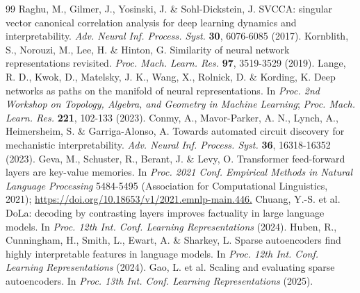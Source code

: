 \documentclass[11pt]{article}
\begin{document}
\begin{thebibliography}{99}
 Raghu, M., Gilmer, J., Yosinski, J. \& Sohl-Dickstein, J. SVCCA: singular vector canonical correlation analysis for deep learning dynamics and interpretability. \emph{Adv. Neural Inf. Process. Syst.} \textbf{30}, 6076-6085 (2017).
 Kornblith, S., Norouzi, M., Lee, H. \& Hinton, G. Similarity of neural network representations revisited. \emph{Proc. Mach. Learn. Res.} \textbf{97}, 3519-3529 (2019).
 Lange, R. D., Kwok, D., Matelsky, J. K., Wang, X., Rolnick, D. \& Kording, K. Deep networks as paths on the manifold of neural representations. In \emph{Proc. 2nd Workshop on Topology, Algebra, and Geometry in Machine Learning}; \emph{Proc. Mach. Learn. Res.} \textbf{221}, 102-133 (2023).
 Conmy, A., Mavor-Parker, A. N., Lynch, A., Heimersheim, S. \& Garriga-Alonso, A. Towards automated circuit discovery for mechanistic interpretability. \emph{Adv. Neural Inf. Process. Syst.} \textbf{36}, 16318-16352 (2023).
 Geva, M., Schuster, R., Berant, J. \& Levy, O. Transformer feed-forward layers are key-value memories. In \emph{Proc. 2021 Conf. Empirical Methods in Natural Language Processing} 5484-5495 (Association for Computational Linguistics, 2021); \url{https://doi.org/10.18653/v1/2021.emnlp-main.446.}
 Chuang, Y.-S. et al. DoLa: decoding by contrasting layers improves factuality in large language models. In \emph{Proc. 12th Int. Conf. Learning Representations} (2024).
 Huben, R., Cunningham, H., Smith, L., Ewart, A. \& Sharkey, L. Sparse autoencoders find highly interpretable features in language models. In \emph{Proc. 12th Int. Conf. Learning Representations} (2024).
 Gao, L. et al. Scaling and evaluating sparse autoencoders. In \emph{Proc. 13th Int. Conf. Learning Representations} (2025).
\end{thebibliography}
\endgroup
\end{document}
